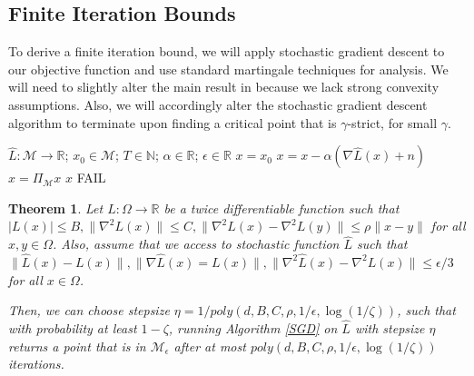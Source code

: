 \documentclass{article}
\newtheorem{theorem}{Theorem}[section]
\newcommand{\N}{{\mathbb{N}}}
\newcommand{\R}{{\mathbb{R}}}
\newcommand{\Authornote}[2]{{\sf\color{red}{[#1: #2]}}}
\newcommand{\Authornote}[2]{}
\newcommand{\Snote}{\Authornote{S}}
\begin{document}
\subsection{Finite Iteration Bounds} 
To derive a finite iteration bound, we will apply stochastic gradient descent to our objective function and use standard martingale techniques for analysis. We will need to slightly alter the main result in \cite{GeHJY15} because we lack strong convexity assumptions. Also, we will accordingly alter the stochastic gradient descent algorithm to terminate upon finding a critical point that is $\gamma$-strict, for small $\gamma$.
%
\begin{algorithm}[hb]
 \caption{$x = SGD(\widehat{L}, x_0, T,\alpha,\epsilon)$}
   \label{SGD}
\begin{algorithmic}
    $\widehat{L}:\mathcal{M} \to \R$; $x_0 \in \mathcal{M}$; $T\in \N$; $\alpha \in \R$; $\epsilon\in\R$
   \vspace{.1in}
    $x = x_0$
   \STATE $x = x - \alpha(\nabla \widehat{L} (x)+n)$ \Snote{What is $n$?}
   \STATE $x = \Pi_\mathcal{M} x$
    $x$
   \ENDIF
   \ENDFOR
    FAIL
\end{algorithmic}
\end{algorithm}





\begin{theorem}\label{strongConverge}
Let $L :\Omega \to \R$ be a twice differentiable function such that $|L(x)| \leq B, \|\nabla^2 L(x)\| \leq C,\|\nabla^2L(x) -\nabla^2L(y)\| \leq \rho\|x - y\|$ for all $x,y\in\Omega$. Also, assume that we access to stochastic function $\widehat{L}$ such that $\|\widehat{L}(x) -L(x)\|, \|\nabla \widehat{L}(x) = L(x)\|, \|\nabla^2\widehat{L}(x) -\nabla^2 L(x)\| \leq \epsilon/3$ for all $x\in \Omega$.

Then, we can choose stepsize $\eta = 1/poly(d,B,C,\rho,1/\epsilon,\log(1/\zeta))$, such that with probability at least $1-\zeta$, running Algorithm \ref{SGD} on $\widehat{L}$ with stepsize $\eta$  returns a point that is in $\mathcal{M}_\epsilon$ after at most $poly(d,B,C,\rho,1/\epsilon, \log(1/\zeta))$ iterations.
\end{theorem}
\end{document}
